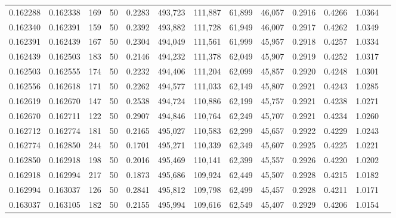\begin{tabular}{rrrrrrrrrrrrr}
0.162288 & 0.162338 &   169 &  50 &                                     0.2283 & 493,723 & 111,887 &  61,899 &  46,057 & 0.2916 & 0.4266 & 1.0364 \\
0.162340 & 0.162391 &   159 &  50 &                                     0.2392 & 493,882 & 111,728 &  61,949 &  46,007 & 0.2917 & 0.4262 & 1.0349 \\
0.162391 & 0.162439 &   167 &  50 &                                     0.2304 & 494,049 & 111,561 &  61,999 &  45,957 & 0.2918 & 0.4257 & 1.0334 \\
0.162439 & 0.162503 &   183 &  50 &                                     0.2146 & 494,232 & 111,378 &  62,049 &  45,907 & 0.2919 & 0.4252 & 1.0317 \\
0.162503 & 0.162555 &   174 &  50 &                                     0.2232 & 494,406 & 111,204 &  62,099 &  45,857 & 0.2920 & 0.4248 & 1.0301 \\
0.162556 & 0.162618 &   171 &  50 &                                     0.2262 & 494,577 & 111,033 &  62,149 &  45,807 & 0.2921 & 0.4243 & 1.0285 \\
0.162619 & 0.162670 &   147 &  50 &                                     0.2538 & 494,724 & 110,886 &  62,199 &  45,757 & 0.2921 & 0.4238 & 1.0271 \\
0.162670 & 0.162711 &   122 &  50 &                                     0.2907 & 494,846 & 110,764 &  62,249 &  45,707 & 0.2921 & 0.4234 & 1.0260 \\
0.162712 & 0.162774 &   181 &  50 &                                     0.2165 & 495,027 & 110,583 &  62,299 &  45,657 & 0.2922 & 0.4229 & 1.0243 \\
0.162774 & 0.162850 &   244 &  50 &                                     0.1701 & 495,271 & 110,339 &  62,349 &  45,607 & 0.2925 & 0.4225 & 1.0221 \\
0.162850 & 0.162918 &   198 &  50 &                                     0.2016 & 495,469 & 110,141 &  62,399 &  45,557 & 0.2926 & 0.4220 & 1.0202 \\
0.162918 & 0.162994 &   217 &  50 &                                     0.1873 & 495,686 & 109,924 &  62,449 &  45,507 & 0.2928 & 0.4215 & 1.0182 \\
0.162994 & 0.163037 &   126 &  50 &                                     0.2841 & 495,812 & 109,798 &  62,499 &  45,457 & 0.2928 & 0.4211 & 1.0171 \\
0.163037 & 0.163105 &   182 &  50 &                                     0.2155 & 495,994 & 109,616 &  62,549 &  45,407 & 0.2929 & 0.4206 & 1.0154 \\

\end{tabular}
